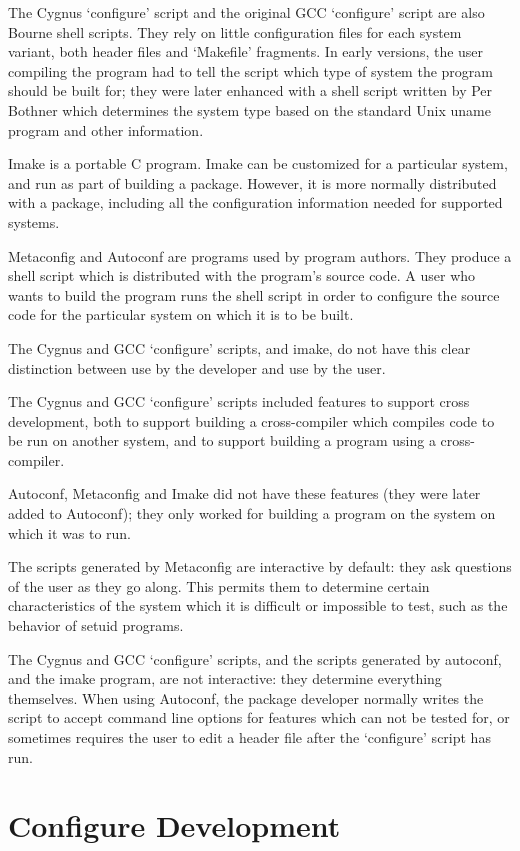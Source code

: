 The Cygnus `configure' script and the original GCC `configure' script are also Bourne shell scripts. They rely on little configuration files for each system variant, both header files and `Makefile' fragments. In early versions, the user compiling the program had to tell the script which type of system the program should be built for; they were later enhanced with a shell script written by Per Bothner which determines the system type based on the standard Unix uname program and other information. 


Imake is a portable C program. Imake can be customized for a particular system, and run as part of building a package. However, it is more normally distributed with a package, including all the configuration information needed for supported systems. 


Metaconfig and Autoconf are programs used by program authors. They produce a shell script which is distributed with the program's source code. A user who wants to build the program runs the shell script in order to configure the source code for the particular system on which it is to be built. 


The Cygnus and GCC `configure' scripts, and imake, do not have this clear distinction between use by the developer and use by the user. 


The Cygnus and GCC `configure' scripts included features to support cross development, both to support building a cross-compiler which compiles code to be run on another system, and to support building a program using a cross-compiler. 


Autoconf, Metaconfig and Imake did not have these features (they were later added to Autoconf); they only worked for building a program on the system on which it was to run. 


The scripts generated by Metaconfig are interactive by default: they ask questions of the user as they go along. This permits them to determine certain characteristics of the system which it is difficult or impossible to test, such as the behavior of setuid programs. 


The Cygnus and GCC `configure' scripts, and the scripts generated by autoconf, and the imake program, are not interactive: they determine everything themselves. When using Autoconf, the package developer normally writes the script to accept command line options for features which can not be tested for, or sometimes requires the user to edit a header file after the `configure' script has run. 

\section{Configure Development}


